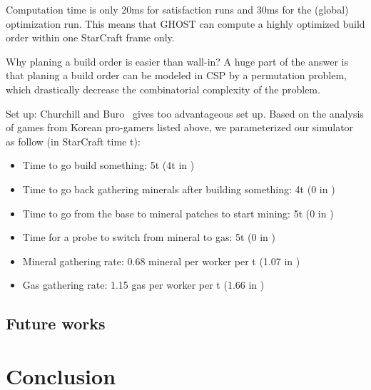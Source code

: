 \documentclass[journal]{IEEEtran}
\newcommand{\csp}{\textsc{CSP}\xspace}
\newcommand{\ghost}{\textsc{GHOST}\xspace}
\begin{document}
Computation time is  only 20ms for satisfaction runs and  30ms for the
(global) optimization run. This means that \ghost can compute a highly
optimized build order within one StarCraft frame only.

Why planing a build  order is easier than wall-in? A  huge part of the
answer is  that planing  a build  order can  be modeled  in \csp  by a
permutation  problem,  which  drastically decrease  the  combinatorial
complexity of the problem.

Set up: Churchill and  Buro~\cite{ChurchillB11} gives too advantageous
set up.  Based on the analysis  of games from Korean pro-gamers listed
above, we parameterized our simulator as follow (in StarCraft time t):
\begin{itemize}
\item Time to go build something: 5t (4t in \cite{ChurchillB11})
\item Time to go back  gathering minerals after building something: 4t
  (0 in \cite{ChurchillB11})
\item Time to go from the base  to mineral patches to start mining: 5t
  (0 in \cite{ChurchillB11})
\item  Time for  a probe  to  switch from  mineral  to gas:  5t (0  in
  \cite{ChurchillB11})
\item Mineral gathering  rate: 0.68 mineral per worker per  t (1.07 in
  \cite{ChurchillB11})
\item  Gas  gathering  rate:  1.15  gas per  worker  per  t  (1.66  in
  \cite{ChurchillB11})
\end{itemize}  

\subsection{Future works}


\section{Conclusion}\label{sec:conclusion}





\end{document}
